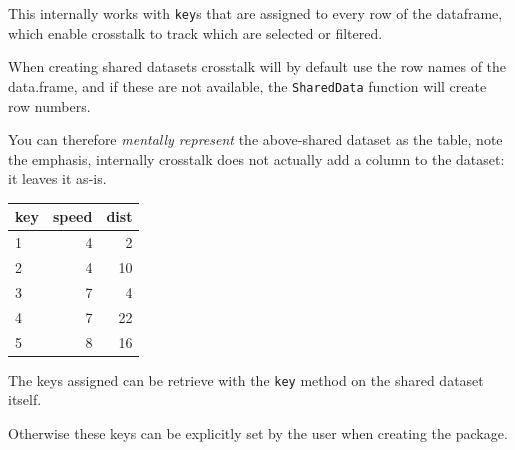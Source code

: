 \documentclass[
]{krantz}
\makeatletter
\newenvironment{Shaded}{\begin{snugshade}}{\end{snugshade}}
\newcommand{\CommentTok}[1]{\textcolor[rgb]{0.37,0.37,0.37}{\textit{#1}}}
\newcommand{\DataTypeTok}[1]{\textcolor[rgb]{0.27,0.27,0.27}{#1}}
\newcommand{\DecValTok}[1]{\textcolor[rgb]{0.06,0.06,0.06}{#1}}
\newcommand{\KeywordTok}[1]{\textcolor[rgb]{0.27,0.27,0.27}{\textbf{#1}}}
\newcommand{\NormalTok}[1]{#1}
\newcommand{\OperatorTok}[1]{\textcolor[rgb]{0.43,0.43,0.43}{\textbf{#1}}}
\newcommand{\StringTok}[1]{\textcolor[rgb]{0.5,0.5,0.5}{#1}}
\newenvironment{kframe}{%
\medskip{}
\setlength{\fboxsep}{.8em}
 \def\at@end@of@kframe{}%
 \ifinner\ifhmode%
  \def\at@end@of@kframe{\end{minipage}}%
  \begin{minipage}{\columnwidth}%
 \fi\fi%
 \def\FrameCommand##1{\hskip\@totalleftmargin \hskip-\fboxsep
 \colorbox{shadecolor}{##1}\hskip-\fboxsep
     \hskip-\linewidth \hskip-\@totalleftmargin \hskip\columnwidth}%
 \MakeFramed {\advance\hsize-\width
   \@totalleftmargin\z@ \linewidth\hsize
   \@setminipage}}%
 {\par\unskip\endMakeFramed%
 \at@end@of@kframe}
\renewenvironment{Shaded}{\begin{kframe}}{\end{kframe}}
\makeatother
\begin{document}
This internally works with \texttt{key}s that are assigned to every row of the dataframe, which enable crosstalk to track which are selected or filtered.

When creating shared datasets crosstalk will by default use the row names of the data.frame, and if these are not available, the \texttt{SharedData} function will create row numbers.

\begin{Shaded}
\end{Shaded}

You can therefore \emph{mentally represent} the above-shared dataset as the table, note the emphasis, internally crosstalk does not actually add a column to the dataset: it leaves it as-is.

\begin{tabular}{l|r|r}
\hline
key & speed & dist\\
\hline
1 & 4 & 2\\
\hline
2 & 4 & 10\\
\hline
3 & 7 & 4\\
\hline
4 & 7 & 22\\
\hline
5 & 8 & 16\\
\hline
\end{tabular}

The keys assigned can be retrieve with the \texttt{key} method on the shared dataset itself.

\begin{Shaded}
\end{Shaded}

Otherwise these keys can be explicitly set by the user when creating the package.

\begin{Shaded}
\end{Shaded}
\end{document}

